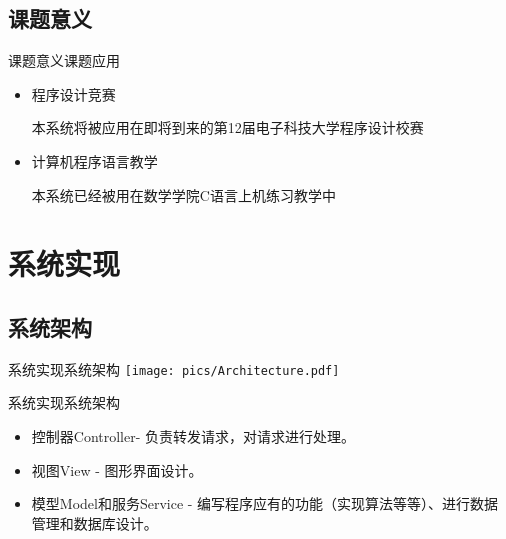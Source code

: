 \documentclass{beamer}
\begin{document}
\subsection{课题意义}
\begin{frame}{课题意义}{课题应用}
\begin{itemize}
	\item 程序设计竞赛

	本系统将被应用在即将到来的第12届电子科技大学程序设计校赛
	\item 计算机程序语言教学

	本系统已经被用在数学学院C语言上机练习教学中
\end{itemize}
\end{frame}

\section{系统实现}
\subsection{系统架构}
\begin{frame}{系统实现}{系统架构}
\texttt{[image: pics/Architecture.pdf]}
\end{frame}

\begin{frame}{系统实现}{系统架构}
\begin{itemize}
	\item 控制器Controller- 负责转发请求，对请求进行处理。
	\item 视图View - 图形界面设计。
	\item 模型Model和服务Service - 编写程序应有的功能（实现算法等等）、进行数据管理和数据库设计。
\end{itemize}
\end{frame}

\end{document}
